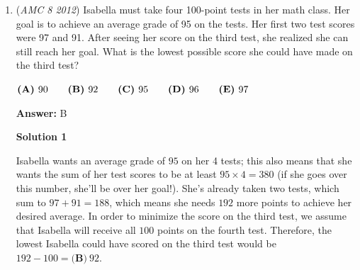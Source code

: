 \begin{enumerate}
 $\textbf{(A)}\hspace{.05in}36\qquad\textbf{(B)}\hspace{.05in}40\qquad\textbf{(C)}\hspace{.05in}64\qquad\textbf{(D)}\hspace{.05in}72\qquad\textbf{(E)}\hspace{.05in}88$

 \textbf{Answer: }E



\textbf{Solution}

In order to find the area of the frame, we need to subtract the area of the photograph from the area of the photograph and the frame together. The area of the photograph is $8 \times 10 = 80$ square inches. The height of the whole frame (including the photograph) would be $8+2+2 = 12$, and the width of the whole frame,  $10+2+2 = 14$. Therefore, the area of the whole figure would be $12 \times 14 = 168$ square inches. Subtracting the area of the photograph from the area of both the frame and photograph, we find the answer to be $168-80 = \boxed{\textbf{(E)}\ 88}$.

 


	\item (\textit{AMC 8 2012}) Isabella must take four 100-point tests in her math class. Her goal is to achieve an average grade of 95 on the tests. Her first two test scores were 97 and 91. After seeing her score on the third test, she realized she can still reach her goal. What is the lowest possible score she could have made on the third test?


 $\textbf{(A)}\hspace{.05in}90\qquad\textbf{(B)}\hspace{.05in}92\qquad\textbf{(C)}\hspace{.05in}95\qquad\textbf{(D)}\hspace{.05in}96\qquad\textbf{(E)}\hspace{.05in}97$

 \textbf{Answer: }B



\textbf{Solution 1}

Isabella wants an average grade of $95$ on her 4 tests; this also means that she wants the sum of her test scores to be at least $95 \times 4 = 380$ (if she goes over this number, she'll be over her goal!). She's already taken two tests, which sum to $97+91 = 188$, which means she needs $192$ more points to achieve her desired average. In order to minimize the score on the third test, we assume that Isabella will receive all $100$ points on the fourth test. Therefore, the lowest Isabella could have scored on the third test would be $192-100 = \boxed{\textbf{(B)}\ 92}$.


\end{enumerate}
